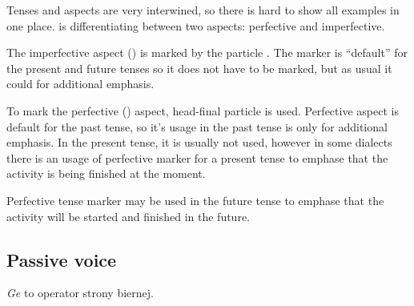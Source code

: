 Tenses and aspects are very interwined, so there is hard to show all examples in
one place. \andro is differentiating between two aspects: perfective and
imperfective.

The imperfective aspect (\Ipfv{}) is marked by the particle . The
marker is ``default'' for the present and future tenses so it does not have to
be marked, but as usual it could for additional emphasis.





To mark the perfective (\Pfv{}) aspect, head-final  particle is used.
Perfective aspect is default for the past tense, so it's usage in the past tense
is only for additional emphasis. In the present tense, it is usually not used,
however in some dialects there is an usage of perfective marker for a present
tense to emphase that the activity is being finished at the moment.

Perfective tense marker may be used in the future tense to emphase that the
activity will be started and finished in the future.





\subsection{Passive voice}

\emph{Ge} to operator strony biernej.



